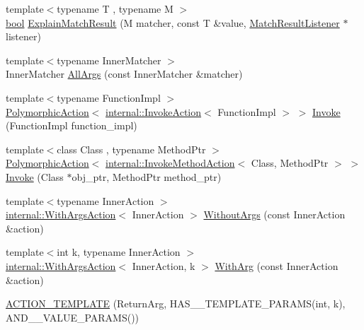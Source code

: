 \begin{DoxyCompactItemize}
\item 
{\footnotesize template$<$typename T , typename M $>$ }\\\hyperlink{classbool}{bool} \hyperlink{namespacetesting_a6d5fbd5104dafc63bf705dafbcb5ce18}{Explain\+Match\+Result} (M matcher, const T \&value, \hyperlink{classtesting_1_1MatchResultListener}{Match\+Result\+Listener} $\ast$listener)
\item 
{\footnotesize template$<$typename Inner\+Matcher $>$ }\\Inner\+Matcher \hyperlink{namespacetesting_a2522e94b71f88fbfbbcf6942cd0c6ee0}{All\+Args} (const Inner\+Matcher \&matcher)
\item 
{\footnotesize template$<$typename Function\+Impl $>$ }\\\hyperlink{classtesting_1_1PolymorphicAction}{Polymorphic\+Action}$<$ \hyperlink{classtesting_1_1internal_1_1InvokeAction}{internal\+::\+Invoke\+Action}$<$ Function\+Impl $>$ $>$ \hyperlink{namespacetesting_a12aebaf8363d49a383047529f798b694}{Invoke} (Function\+Impl function\+\_\+impl)
\item 
{\footnotesize template$<$class Class , typename Method\+Ptr $>$ }\\\hyperlink{classtesting_1_1PolymorphicAction}{Polymorphic\+Action}$<$ \hyperlink{classtesting_1_1internal_1_1InvokeMethodAction}{internal\+::\+Invoke\+Method\+Action}$<$ Class, Method\+Ptr $>$ $>$ \hyperlink{namespacetesting_a80b82dc382445d240ff011f9c34aefc4}{Invoke} (Class $\ast$obj\+\_\+ptr, Method\+Ptr method\+\_\+ptr)
\item 
{\footnotesize template$<$typename Inner\+Action $>$ }\\\hyperlink{classtesting_1_1internal_1_1WithArgsAction}{internal\+::\+With\+Args\+Action}$<$ Inner\+Action $>$ \hyperlink{namespacetesting_aeac85f74bd11112f69142e92e3a50780}{Without\+Args} (const Inner\+Action \&action)
\item 
{\footnotesize template$<$int k, typename Inner\+Action $>$ }\\\hyperlink{classtesting_1_1internal_1_1WithArgsAction}{internal\+::\+With\+Args\+Action}$<$ Inner\+Action, k $>$ \hyperlink{namespacetesting_af76590c6cecc621e1ab4b681a9ea209b}{With\+Arg} (const Inner\+Action \&action)
\item 
\hyperlink{namespacetesting_a109d48f969260878ed1e743006196992}{A\+C\+T\+I\+O\+N\+\_\+\+T\+E\+M\+P\+L\+A\+TE} (Return\+Arg, H\+A\+S\+\_\+\_\+\+T\+E\+M\+P\+L\+A\+T\+E\+\_\+\+P\+A\+R\+A\+MS(int, k), A\+N\+D\+\_\+\_\+\+V\+A\+L\+U\+E\+\_\+\+P\+A\+R\+A\+MS())
\item 

\end{DoxyCompactItemize}
